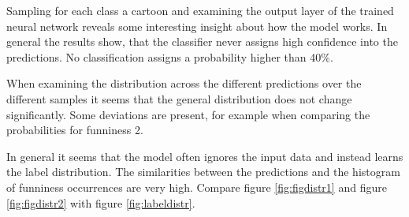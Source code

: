 \documentclass[draft,final,oneside]{vutinfth} %
\begin{document}
Sampling for each class a cartoon and examining the output layer of the trained neural network reveals some interesting insight about how the model works. In general the results show, that the classifier never assigns high confidence into the predictions. No classification assigns a probability higher than 40\%.

When examining the distribution across the different predictions over the different samples it seems that the general distribution does not change significantly. Some deviations are present, for example when comparing the probabilities for funniness 2.

In general it seems that the model often ignores the input data and instead learns the label distribution. The similarities between the predictions and the histogram of funniness occurrences are very high. Compare figure \ref{fig:figdistr1} and figure \ref{fig:figdistr2} with figure \ref{fig:labeldistr}.
\end{document}
